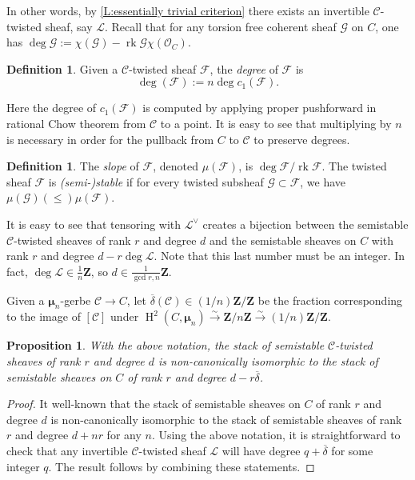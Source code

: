 \documentclass[11pt]{amsart}
\newcommand{\field}[1]{\mathbf #1}
\newcommand{\ms}[1]{\mathscr #1}
\newcommand{\widebar}[1]{\overline{#1}}
\newcommand{\Z}{\field Z}
\newcommand{\simto}{\stackrel{\sim}{\to}}
\newcommand{\m}{\boldsymbol{\mu}}
\renewcommand{\H}{\operatorname{H}}
\renewcommand{\[}{[\!\hspace{0.03em}[}
\renewcommand{\]}{]\!\hspace{0.03em}]}
\renewcommand{\(}{(\!\hspace{0.03em}(}
\renewcommand{\)}{)\!\hspace{0.03em})}
\DeclareMathOperator{\rk}{\operatorname{rk}}
\newtheorem{prop}[lem]{Proposition}
\theoremstyle{definition}
\newtheorem{defn}[lem]{Definition}
\theoremstyle{remark}
\begin{document}
In other words, by \ref{L:essentially trivial criterion} there exists an invertible $\ms C$-twisted sheaf, 
say $\ms L$.  Recall that for any torsion free coherent sheaf $\ms G$ on $C$, one 
has $\deg\ms G:=\chi(\ms G)-\rk\ms G\chi({\ms O}_{C})$.  

\begin{defn} Given a $\ms C$-twisted sheaf $\ms F$, the \emph{degree\/} of $\ms F$ 
is $$\deg(\ms F):=n\deg c_1(\ms F).$$
\end{defn}
Here the degree of $c_1(\ms F)$ is computed by applying proper pushforward in rational Chow theorem from $\ms C$ to a point.  It is easy to see that multiplying by $n$ is necessary in order for the pullback from $C$ to $\ms C$ to preserve degrees.

\begin{defn} The \emph{slope\/} of $\ms F$, 
denoted $\mu(\ms F)$, is $\deg\ms F/\rk\ms F$.  The twisted sheaf $\ms F$ is 
\emph{(semi-)stable\/} if for every twisted subsheaf $\ms G\subset\ms 
F$, we have $\mu(\ms G)(\leq)\mu(\ms F)$. 
\end{defn}
It is easy to see that tensoring with 
$\ms L^{\vee}$ creates a bijection between the semistable $\ms 
C$-twisted sheaves of rank $r$ and degree $d$ and the 
semistable sheaves on $C$ with rank $r$ and degree $d-r\deg\ms L$.  
Note that this last number must be an integer.  In fact, $\deg\ms 
L\in\frac{1}{n}\Z$, so $d\in\frac{1}{\gcd{r,n}}\Z$.

Given a $\m_n$-gerbe $\ms C\to C$, let $\widebar{\delta}(\ms C)\in(1/n)\Z/\Z$ be the fraction corresponding to the image of $[\ms C]$ under $\H^2(C,\m_n)\simto\Z/n\Z\simto(1/n)\Z/\Z$.

\begin{prop}\label{P:on curves nada} With the above notation, the stack of semistable $\ms C$-twisted sheaves 
of rank $r$ and degree $d$
is non-canonically isomorphic to the stack of semistable 
sheaves on $C$ of rank $r$ and degree $d-r\widebar{\delta}$.
\end{prop}
\begin{proof} It well-known 
that the stack of semistable sheaves on $C$ of rank $r$ and 
degree $d$ is non-canonically isomorphic to the stack of semistable 
sheaves of rank $r$ and degree $d+nr$ for any $n$.  Using the above notation, it is straightforward to check that any invertible $\ms C$-twisted sheaf $\ms L$ will have degree $q+\widebar{\delta}$ 
for some integer $q$.  The result follows by combining these statements.
\end{proof}
\end{document}
